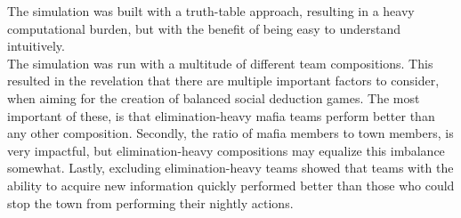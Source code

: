 The simulation was built with a truth-table approach, resulting in a heavy
computational burden, but with the benefit of being easy to understand
intuitively. \\
The simulation was run with a multitude of different team compositions. This
resulted in the revelation that there are multiple important factors to consider, when
aiming for the creation of balanced social deduction games. The most important of these, is that elimination-heavy mafia teams perform better than any other composition. Secondly, the ratio of mafia members to town members, is very impactful, but elimination-heavy compositions may equalize this imbalance somewhat. Lastly, excluding elimination-heavy teams showed that teams with the ability to acquire new information quickly performed better than those who could stop the town from performing their nightly actions.\\
\twocolumn